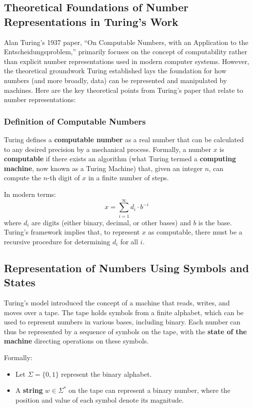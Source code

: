 \subsection{Theoretical Foundations of Number Representations in Turing's Work}

Alan Turing’s 1937 paper, “On Computable Numbers, with an Application to the Entscheidungsproblem,” primarily focuses on the concept of computability rather than explicit number representations used in modern computer systems. However, the theoretical groundwork Turing established lays the foundation for how numbers (and more broadly, data) can be represented and manipulated by machines. Here are the key theoretical points from Turing's paper that relate to number representations:

\subsubsection{Definition of Computable Numbers}

Turing defines a \textbf{computable number} as a real number that can be calculated to any desired precision by a mechanical process. Formally, a number \( x \) is \textbf{computable} if there exists an algorithm (what Turing termed a \textbf{computing machine}, now known as a Turing Machine) that, given an integer \( n \), can compute the \( n \)-th digit of \( x \) in a finite number of steps.

In modern terms:
\[
x = \sum_{i=1}^{\infty} d_i \cdot b^{-i}
\]
where \( d_i \) are digits (either binary, decimal, or other bases) and \( b \) is the base. Turing’s framework implies that, to represent \( x \) as computable, there must be a recursive procedure for determining \( d_i \) for all \( i \).

\subsection{Representation of Numbers Using Symbols and States}

Turing’s model introduced the concept of a machine that reads, writes, and moves over a tape. The tape holds symbols from a finite alphabet, which can be used to represent numbers in various bases, including binary. Each number can thus be represented by a sequence of symbols on the tape, with the \textbf{state of the machine} directing operations on these symbols.

Formally:
\begin{itemize}
    \item Let \( \Sigma = \{0, 1\} \) represent the binary alphabet.
    \item A \textbf{string} \( w \in \Sigma^* \) on the tape can represent a binary number, where the position and value of each symbol denote its magnitude.
\end{itemize}

